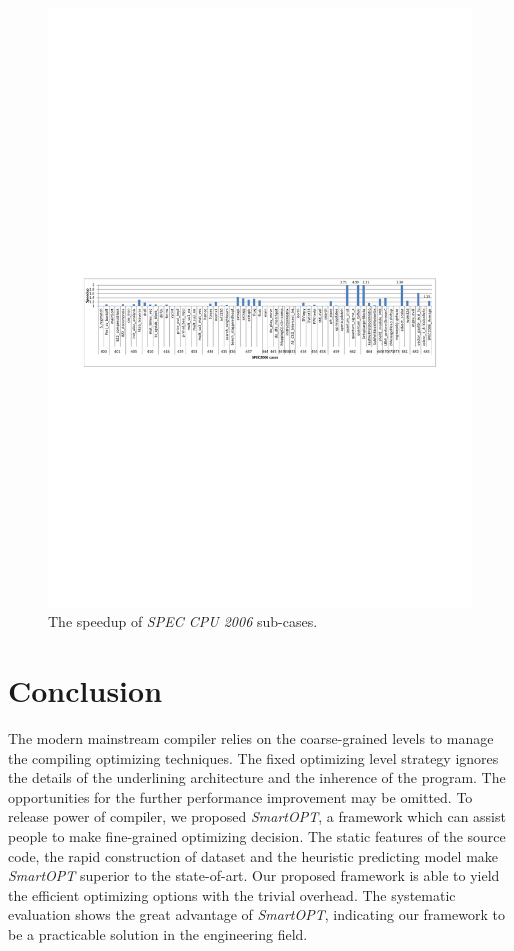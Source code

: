 \documentclass[bst/sn-mathphys]{sn-jnl}%
\theoremstyle{thmstyleone}%
\theoremstyle{thmstyletwo}%
\theoremstyle{thmstylethree}%
\begin{document}
\begin{figure}[h]%
\centering
\includegraphics[width=1\textwidth]{fig/spec2006.pdf}
\caption{The speedup of \emph{SPEC CPU 2006} sub-cases.}\label{FIG13}
\end{figure}


\section{Conclusion}\label{sec7}
The modern mainstream compiler relies on the coarse-grained levels to manage 
the compiling optimizing techniques. The fixed optimizing level strategy 
ignores the details of the underlining architecture and the inherence of the 
program. The opportunities for the further performance improvement may be 
omitted. To release power of compiler, we proposed \emph{SmartOPT}, a framework 
which can assist people to make fine-grained optimizing decision. The static 
features of the source code, the rapid construction of dataset and the heuristic 
predicting model make \emph{SmartOPT} superior to the state-of-art. Our proposed 
framework is able to yield the efficient optimizing options with the trivial 
overhead. The systematic evaluation shows the great advantage of 
\emph{SmartOPT}, indicating our framework to be a practicable solution in the 
engineering field.
\end{document}
